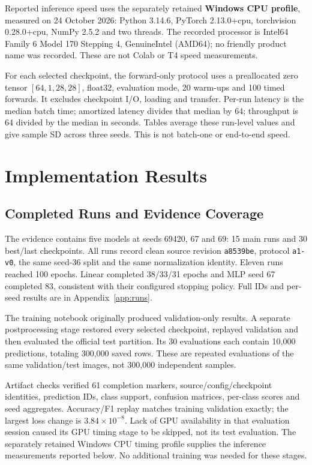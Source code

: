 \documentclass[oneside,final,a4paper]{hcmut-report}
\begin{document}
Reported inference speed uses the separately retained \textbf{Windows CPU profile},
measured on 24 October 2026: Python 3.14.6, PyTorch 2.13.0+cpu, torchvision
0.28.0+cpu, NumPy 2.5.2 and two threads. The recorded processor is Intel64
Family 6 Model 170 Stepping 4, GenuineIntel (AMD64); no friendly product name
was recorded. These are not Colab or T4 speed measurements.

For each selected checkpoint, the forward-only protocol uses a preallocated
zero tensor \([64,1,28,28]\), float32, evaluation mode, 20 warm-ups and 100 timed
forwards. It excludes checkpoint I/O, loading and transfer. Per-run latency is
the median batch time; amortized latency divides that median by 64; throughput
is 64 divided by the median in seconds. Tables average these run-level values
and give sample SD across three seeds. This is not batch-one or end-to-end speed.
\FloatBarrier

\clearpage
\section{Implementation Results}
\label{sec:results}
\subsection{Completed Runs and Evidence Coverage}
The evidence contains five models at seeds 69420, 67 and 69: 15 main runs and
30 best/last checkpoints. All runs record clean source revision \texttt{a8539be},
protocol \texttt{a1-v0}, the same seed-36 split and the same normalization identity.
Eleven runs reached 100 epochs. Linear completed 38/33/31 epochs and MLP seed 67
completed 83, consistent with their configured stopping policy. Full IDs and
per-seed results are in Appendix~\ref{app:runs}.

The training notebook originally produced validation-only results. A separate
postprocessing stage restored every selected checkpoint, replayed validation and
then evaluated the official test partition. Its 30 evaluations each contain
10,000 predictions, totaling 300,000 saved rows. These are repeated evaluations
of the same validation/test images, not 300,000 independent samples.

Artifact checks verified 61 completion markers, source/config/checkpoint identities,
prediction IDs, class support, confusion matrices, per-class scores and seed
aggregates. Accuracy/F1 replay matches training validation exactly; the largest
loss change is \(3.84\times10^{-8}\). Lack of GPU availability in that evaluation
session caused its GPU timing stage to be skipped, not its test evaluation.
The separately retained Windows CPU timing profile supplies the inference
measurements reported below. No additional training was needed for these stages.
\end{document}
